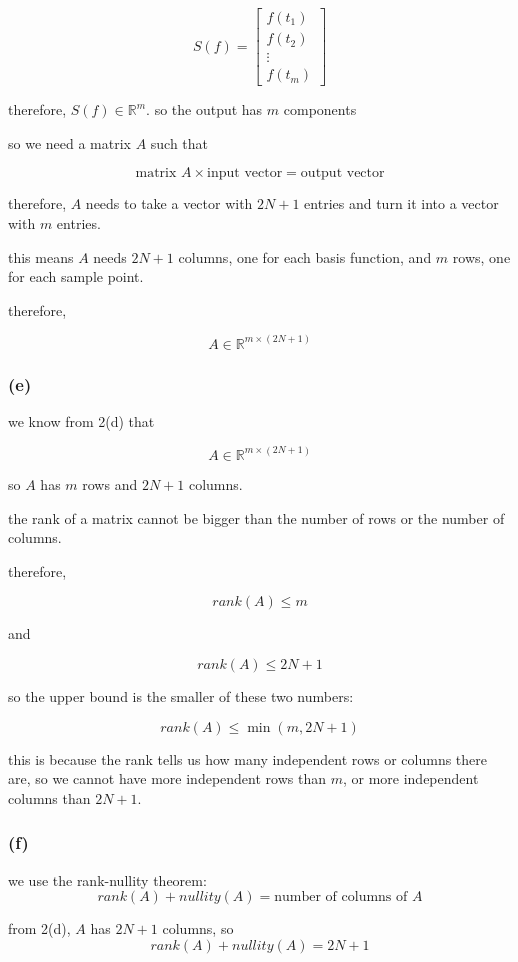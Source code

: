 \documentclass{article}
\begin{document}
\[
S(f) =
\begin{bmatrix}
    f(t_1)\\
    f(t_2)\\
    \vdots\\
    f(t_m)
\end{bmatrix}
\]

therefore, $S(f) \in \mathbb{R}^m$. so the output has $m$ components

so we need a matrix $A$ such that

\[
\text{matrix }A \times \text{input vector} = \text{output vector}
\]

therefore, $A$ needs to take a vector with $2N+1$ entries and turn it into a vector with $m$ entries.

this means $A$ needs $2N+1$ columns, one for each basis function, and $m$ rows, one for each sample point.

therefore,

\[
\boxed{A\in\mathbb{R}^{m\times(2N+1)}}
\]

\subsubsection*{(e)}
we know from 2(d) that

\[
A\in\mathbb{R}^{m\times(2N+1)}
\]

so $A$ has $m$ rows and $2N+1$ columns.

the rank of a matrix cannot be bigger than the number of rows or the number of columns.

therefore,

\[
rank(A)\leq m
\]

and

\[
rank(A)\leq 2N+1
\]

so the upper bound is the smaller of these two numbers:

\[
\boxed{rank(A)\leq\min(m,2N+1)}
\]

this is because the rank tells us how many independent rows or columns there are, so we cannot have more independent rows than $m$, or more independent columns than $2N+1$.

\subsubsection*{(f)}
we use the rank-nullity theorem:
\[
rank(A)+nullity(A)=\text{number of columns of }A
\]

from 2(d), $A$ has $2N+1$ columns, so
\[
rank(A)+nullity(A)=2N+1
\]
\end{document}
